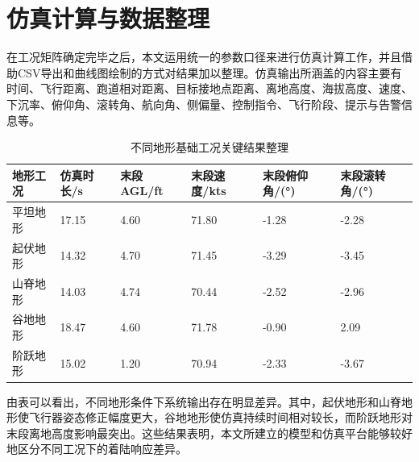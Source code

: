 \section{仿真计算与数据整理}

在工况矩阵确定完毕之后，本文运用统一的参数口径来进行仿真计算工作，并且借助CSV导出和曲线图绘制的方式对结果加以整理。仿真输出所涵盖的内容主要有时间、飞行距离、跑道相对距离、目标接地点距离、离地高度、海拔高度、速度、下沉率、俯仰角、滚转角、航向角、侧偏量、控制指令、飞行阶段、提示与告警信息等。

\begin{table}[H]
\centering
\caption{不同地形基础工况关键结果整理}
\begin{tabular}{|l|l|l|l|l|l|}
\hline
\textbf{地形工况} & \textbf{仿真时长/s} & \textbf{末段AGL/ft} & \textbf{末段速度/kts} & \textbf{末段俯仰角/(°)} & \textbf{末段滚转角/(°)} \\
\hline
平坦地形 & 17.15 & 4.60 & 71.80 & -1.28 & -2.28 \\
\hline
起伏地形 & 14.32 & 4.70 & 71.45 & -3.29 & -3.45 \\
\hline
山脊地形 & 14.03 & 4.74 & 70.44 & -2.52 & -2.96 \\
\hline
谷地地形 & 18.47 & 4.60 & 71.78 & -0.90 & 2.09 \\
\hline
阶跃地形 & 15.02 & 1.20 & 70.94 & -2.33 & -3.67 \\
\hline
\end{tabular}
\end{table}

由表可以看出，不同地形条件下系统输出存在明显差异。其中，起伏地形和山脊地形使飞行器姿态修正幅度更大，谷地地形使仿真持续时间相对较长，而阶跃地形对末段离地高度影响最突出。这些结果表明，本文所建立的模型和仿真平台能够较好地区分不同工况下的着陆响应差异。
